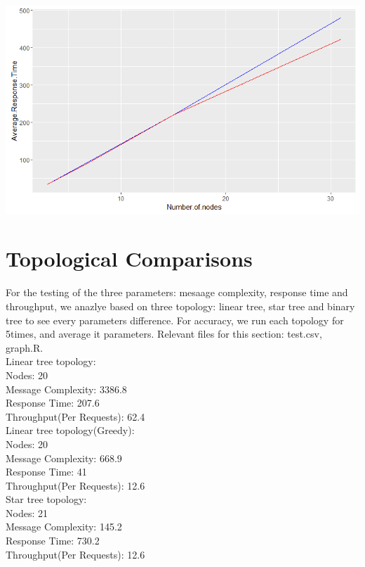 \documentclass{article}
\begin{document}
\begin{center}
    \includegraphics[width=\textwidth]{figs/Plot6} \\
\end{center}

\section{Topological Comparisons}

For the testing of the three parameters: mesaage complexity, response time and throughput, we anazlye based on three topology: linear tree, star tree and binary tree to see every parameters difference. For accuracy, we run each topology for 5times, and average it parameters. Relevant files for this section: test.csv, graph.R. \\

\noindent
Linear tree topology: \\
Nodes: 20 \\
Message Complexity: 3386.8\\
Response Time: 207.6\\
Throughput(Per Requests): 62.4\\

\noindent
Linear tree topology(Greedy): \\
Nodes: 20 \\
Message Complexity: 668.9\\
Response Time: 41\\
Throughput(Per Requests): 12.6\\

\noindent
Star tree topology: \\
Nodes: 21 \\
Message Complexity: 145.2\\
Response Time: 730.2\\
Throughput(Per Requests): 12.6\\
\end{document}
